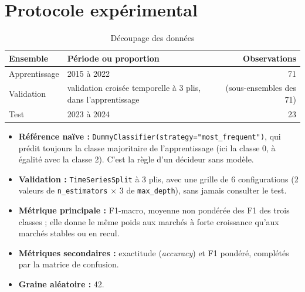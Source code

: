 \documentclass[11pt,a4paper]{article}
\begin{document}
\section{Protocole expérimental}
\label{sec:protocole}
\begin{table}[htbp]
  \centering
  \caption{Découpage des données}
  \label{tab:decoupage}
  \small
  \begin{tabular}{@{}l l r@{}}
    \toprule
    Ensemble & Période ou proportion & Observations \\
    \midrule
    Apprentissage & 2015 à 2022 & 71 \\
    Validation & validation croisée temporelle à 3 plis, dans l'apprentissage & (sous-ensembles des 71) \\
    Test & 2023 à 2024 & 23 \\
    \bottomrule
  \end{tabular}
\end{table}

\begin{itemize}
  \item \textbf{Référence naïve :} \texttt{DummyClassifier(strategy="most\_frequent")}, qui prédit toujours la classe majoritaire de l'apprentissage (ici la classe 0, à égalité avec la classe 2). C'est la règle d'un décideur sans modèle.
  \item \textbf{Validation :} \texttt{TimeSeriesSplit} à 3 plis, avec une grille de 6 configurations (2 valeurs de \texttt{n\_estimators} $\times$ 3 de \texttt{max\_depth}), sans jamais consulter le test.
  \item \textbf{Métrique principale :} F1-macro, moyenne non pondérée des F1 des trois classes ; elle donne le même poids aux marchés à forte croissance qu'aux marchés stables ou en recul.
  \item \textbf{Métriques secondaires :} exactitude (\textit{accuracy}) et F1 pondéré, complétés par la matrice de confusion.
  \item \textbf{Graine aléatoire :} 42.
\end{itemize}

\end{document}
